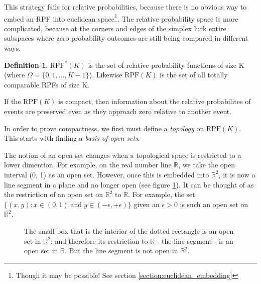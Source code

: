 \documentclass[twoside]{article}
\theoremstyle{plain}%
\theoremstyle{definition}
\newtheorem{definition}{Definition}[section]
\theoremstyle{remark}
\begin{document}
This strategy fails for relative probabilities, because there is no obvious way to embed an RPF into euclidean space\footnote{Though it may be possible! See section \ref{section:euclidean_embedding}}. The relative probability space is more complicated, because at the corners and edges of the simplex lurk entire subspaces where zero-probability outcomes are still being compared in different ways.

\begin{definition}
\(\text{RPF}^{\ast}(K)\) is the set of relative probability functions of size K (where \(\Omega = \{0, 1, ..., K - 1\}\)). Likewise \(\text{RPF}(K)\) is the set of all totally comparable RPFs of size K.
\end{definition}

If the \(\text{RPF}(K)\) is compact, then information about the relative probabilites of events are preserved even as they approach zero relative to another event.

In order to prove compactness, we first must define a \textit{topology} on \(\text{RPF}(K)\). This starts with finding a \textit{basis of open sets}.

The notion of an open set changes when a topological space is restricted to a lower dimention. For example, on the real number line \(\mathbb{R}\), we take the open interval (0, 1) as an open set. However, once this is embedded into \(\mathbb{R}^2\), it is now a line segment in a plane and no longer open (see figure \ref{fig:sub_topology}). It can be thought of as the restriction of an open set on \(\mathbb{R}^2\) to \(\mathbb{R}\). For example, the set \(\{(x, y): x \in (0, 1)\;  \text{and}\;  y \in (-\epsilon, +\epsilon)\}\) given an \(\epsilon > 0\) is such an open set on \(\mathbb{R}^2\).

\begin{figure}[h]
\centering
{}
\caption{The small box that is the interior of the dotted rectangle is an open set in \(\mathbb{R}^2\), and therefore its restriction to \(\mathbb{R}\) - the line segment - is an open set in \(\mathbb{R}\). But the line segment is not open in \(\mathbb{R}^2\).}
\label{fig:sub_topology}
\end{figure}
\end{document}
